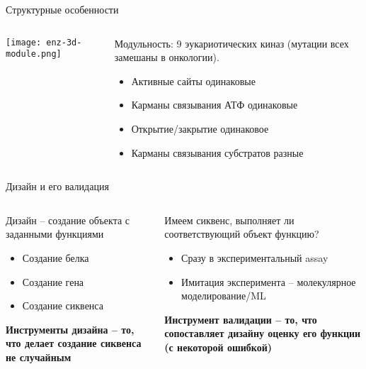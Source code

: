 \begin{frame}{Структурные особенности}
\begin{columns}
\begin{column}{0.5\textwidth}
    \texttt{[image: enz-3d-module.png]}
\end{column}
\begin{column}{0.5\textwidth}
    Модульность: 9 эукариотических киназ (мутации всех замешаны в онкологии). 
\begin{itemize}
    \item Активные сайты одинаковые
    \item Карманы связывания АТФ одинаковые
    \item Открытие/закрытие одинаковое
    \item Карманы связывания субстратов разные
\end{itemize}
\end{column}
\end{columns}
\end{frame}


\begin{frame}{Дизайн и его валидация}
\begin{columns}
\begin{column}{0.5\textwidth}
    Дизайн – создание объекта
с заданными функциями
\begin{itemize}
    \item Создание белка
    \item Создание гена
    \item Создание сиквенса
\end{itemize}        
\textbf{
Инструменты дизайна – то, что делает создание сиквенса не случайным
}
\end{column}
\begin{column}{0.5\textwidth}
    Имеем сиквенс, выполняет ли соответствующий объект функцию?
\begin{itemize}
    \item Сразу в экспериментальный assay
    \item Имитация эксперимента – молекулярное моделирование/ML
\end{itemize}
\textbf{Инструмент валидации – то, что сопоставляет дизайну оценку его функции (с некоторой ошибкой)}
\end{column}
\end{columns}
\end{frame}

